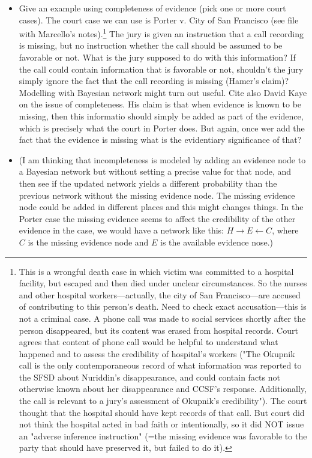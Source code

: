 \documentclass[
  10pt,
  dvipsnames,enabledeprecatedfontcommands]{scrartcl}
\begin{document}
\begin{itemize}

\item Give an example using completeness of evidence (pick one or more court cases). The court case we can use is Porter v. City of San Francisco (see file with Marcello's notes).\footnote{This is a wrongful death case in which victim was committed to a hospital facility, but escaped and then died under unclear circumstances. So the nurses and other hospital workers---actually, the city of San Francisco---are accused of contributing to this person's death. Need to check exact accusation---this is not a criminal case. A phone call was made to social services shortly after the person disappeared, but its content was erased from hospital records. Court agrees that content of phone call would be helpful to understand what happened and to assess the credibility of hospital's workers ("The Okupnik call is the only contemporaneous record of what information was reported to the SFSD about Nuriddin’s disappearance, and could contain facts not otherwise known about her disappearance and CCSF’s response. Additionally, the call is relevant to a jury’s assessment of Okupnik’s credibility"). The court thought that the hospital should have kept records of that call. But court did not think the hospital acted in bad faith or intentionally, so it did NOT issue an "adverse inference instruction" (=the missing evidence was favorable to the party that should have preserved it, but failed to do it).} The jury is given an instruction that a call recording is missing, but no instruction whether the call should be assumed to be favorable or not. What is the jury supposed to do with this information? If the call could contain information that is favorable or not, shouldn't the jury simply ignore the fact that the call recording is missing (Hamer's claim)? Modelling with Bayesian network might turn out useful. Cite also David Kaye on the issue of completeness.  His claim is that when evidence is known to be missing, then this informatio should simply be added as part of the evidence, which is precisely what the court in Porter does. But again, once wer add the fact that the evidence is missing what is the evidentiary significance of that?

\item[] (I am thinking that incompleteness is modeled by adding an evidence node to a Bayesian network but without setting a precise value for that node, and then see if the updated network yields a different probability than the previous network without the missing evidence node. The missing evidence node could be added in different places and this might changes things. In the Porter case the missing evidence seems to affect the credibility of the other evidence in the case, we would have a network like this: $H\rightarrow E \leftarrow C$, where $C$ is the missing evidence node and $E$ is the available evidence nose.)



\end{itemize}
\end{document}
